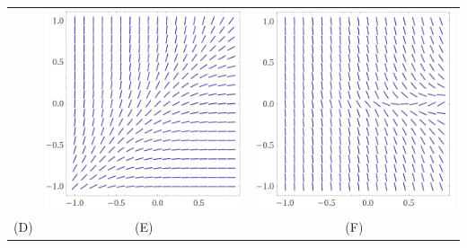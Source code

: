 \begin{tabular}{ccc}
		& \includegraphics*[height=\len]{images/module9-graph5}
		& \includegraphics*[height=\len]{images/module9-graph6} \\
		(D) & (E) & (F)
\end{tabular}

